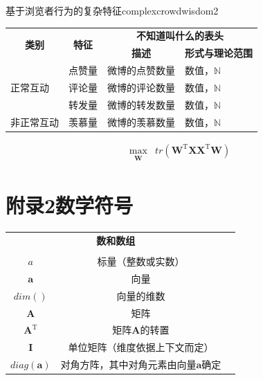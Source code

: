 \documentclass[a4paper,AutoFakeBold,oneside,12pt]{book}
\begin{document}
\begin{bupttable}{基于浏览者行为的复杂特征}{complexcrowdwisdom2}
    \begin{tabular}{l|l|l|l}
		\hline
        \multicolumn{1}{c|}{\multirow{2}{*}{\textbf{类别}}} & \multicolumn{1}{c|}{\multirow{2}{*}{\textbf{特征}}} & \multicolumn{2}{c}{\textbf{不知道叫什么的表头}} \\
        \cline{3-4}
         & & \multicolumn{1}{c|}{\textbf{描述}} & \multicolumn{1}{c}{\textbf{形式与理论范围}} \\
		\hline
        \multirow{3}{*}{正常互动} & 点赞量 & 微博的点赞数量 & 数值，$\mathbb{N}$ \\
		\cline{2-4}
         & 评论量 & 微博的评论数量 & 数值，$\mathbb{N}$ \\
		\cline{2-4}
         & 转发量 & 微博的转发数量 & 数值，$\mathbb{N}$ \\
		\hline
        非正常互动 & 羡慕量 & 微博的羡慕数量 & 数值，$\mathbb{N}$ \\
        \hline
    \end{tabular}
\end{bupttable}

\begin{equation}
\label{PCA_goal}
\begin{aligned}
\max_{\substack{\bm{W}}}  &  tr(\bm{W}^\mathrm{T}\bm{X}\bm{X}^ \mathrm{T}\bm{W})
\end{aligned}
\end{equation}

\clearpage
{}
{}
\section*{附录2\quad{}数学符号}
\begin{center}
	\begin{tabular}{ccc}
		\multicolumn{2}{c}{\textbf{数和数组}} \\
		\\
		$a$ & 标量（整数或实数）\\
		$\bm{a}$ & 向量\\
		$dim()$ & 向量的维数\\
		$\bm{A}$ & 矩阵\\
		$\bm{A}^\mathrm{T}$ & 矩阵$\textbf{A}$的转置\\
		$\bm{I}$ & 单位矩阵（维度依据上下文而定） \\
 		$diag(\bm{a})$ & 对角方阵，其中对角元素由向量$\bm{a}$确定 \\

	\end{tabular}
\end{center}
\end{document}
